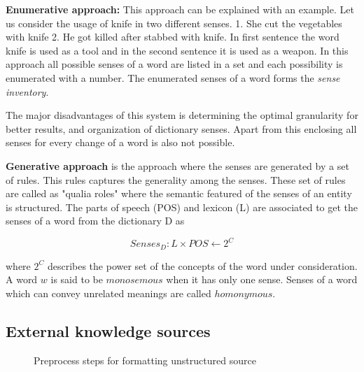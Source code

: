 \documentclass{bmcart}
\def\texttt{[image: ]}
\begin{document}
{\bf Enumerative approach:} This approach can be explained with an example. Let us consider the usage of knife in two different senses. 1. She cut the vegetables with knife 2. He got killed after stabbed with knife. In first sentence the word knife is used as a tool and in the second sentence it is used as a weapon.  In this approach all possible senses of a word are listed in a set and each possibility is enumerated with a number. The enumerated senses of a word forms the {\it sense inventory}. 

The major disadvantages of this system is determining the optimal granularity for better results, and organization of dictionary senses. Apart from this enclosing all  senses for every change of a word is also not possible. 

{\bf Generative approach} is the approach where the senses are generated by a set of rules. This rules captures the generality among the senses. These set of rules are called as "qualia roles" where the semantic featured of the senses of an entity is structured. The parts of speech (POS) and lexicon (L) are associated to get the senses of a word from the dictionary D as

\begin{center}
\vspace{-0.6cm}
\begin{equation}
Senses_D : L \times POS \leftarrow 2^C
\end{equation}
\vspace{-0.6cm}
\end{center}
where $2^C$ describes the power set of the concepts of the word under consideration. A word $w$ is said to be $monosemous$ when it has only one sense.  Senses of a word which can convey unrelated meanings are called $homonymous$.

\subsection{External knowledge sources}
\label{ssec:external_knowledge}

\begin{figure}[h!tb]
\centering
{}
\caption{Preprocess steps for formatting unstructured source}
\end{figure}
\end{document}
